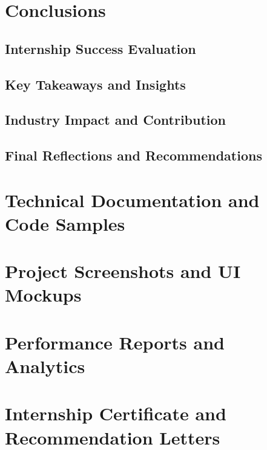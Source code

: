 \documentclass[a4paper, 11pt, oneside]{report}
\begin{document}
\chapter{Conclusions}
  \section{Internship Success Evaluation}
  \section{Key Takeaways and Insights}
  \section{Industry Impact and Contribution}
  \section{Final Reflections and Recommendations}
  

\appendix
\chapter{Technical Documentation and Code Samples}
\chapter{Project Screenshots and UI Mockups}
\chapter{Performance Reports and Analytics}
\chapter{Internship Certificate and Recommendation Letters}



\end{document}

